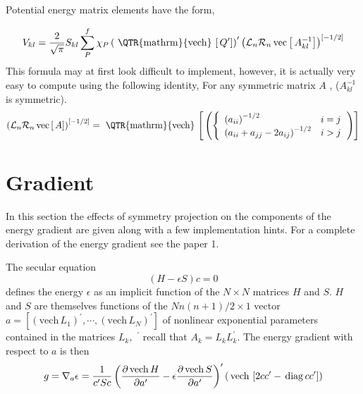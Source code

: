 \documentclass[12pt,thmsa,suthesis,verbatim]{report}
\begin{document}
Potential energy matrix elements have the form,

\begin{equation}
V_{kl}=\frac 2{\sqrt{\pi }}S_{kl}\sum_P^f\chi _P\left( \,\mathrm{\,%
\QTR{mathrm}{vech}\,}\left[ \,Q^{\prime }\right] \right) ^{\prime }\left( 
\mathcal{L}_n\mathcal{R}_n\,\mathrm{vec}\left[ \,A_{kl}^{-1}\right] \right)
^{\left[ -1/2\right] }  \label{Vkl}
\end{equation}
This formula may at first look difficult to implement, however, it is
actually very easy to compute using the following identity, For any
symmetric matrix $A$ , ($A_{kl}^{-1}$ is symmetric). 
\begin{equation}
\left( \mathcal{L}_n\mathcal{R}_n\,\mathrm{vec}\left[ \,A\right] \right)
^{\left[ -1/2\right] }=\,\mathrm{\,\QTR{mathrm}{vech}\,}\left[ \,\left(
\left\{ 
\begin{array}{ll}
\left( a_{ii}\right) ^{-1/2} & i=j \\ 
\left( a_{ii}+a_{jj}-2a_{ij}\right) ^{-1/2} & i>j
\end{array}
\right. \right) \right]
\end{equation}

\section{Gradient}

In this section the effects of symmetry projection on the components of the
energy gradient are given along with a few implementation hints. For a
complete derivation of the energy gradient see the paper 1.

The secular equation 
\begin{equation}
\left( H-\epsilon S\right) c=0
\end{equation}
defines the energy $\epsilon $ as an implicit function of the $N\times N$
matrices $H$ and $S$. $H$ and $S$ are themselves functions of the $Nn\left(
n+1\right) /2\times 1$ vector $a=\left[ \left( \mathrm{vech}\,L_1\right)
^{\prime },\cdots ,\left( \mathrm{vech}\,L_N\right) ^{\prime }\right] $ of
nonlinear exponential parameters contained in the matrices $L_k,$ $^{\prime
} $ recall that $A_k=L_kL_k^{\prime }$. The energy gradient with respect to $%
a$ is then 
\begin{equation}
g=\nabla _a\epsilon =\frac 1{c^{\prime }Sc}\left( \frac{\partial \,\mathrm{%
vech}\,H}{\partial a^{\prime }}-\epsilon \frac{\partial \,\mathrm{vech}\,S}{%
\partial a^{\prime }}\right) ^{\prime }\left( \,\mathrm{vech}\,\left[
2cc^{\prime }-\,\mathrm{diag}\,cc^{\prime }\right] \right)  \label{grad}
\end{equation}
\end{document}
